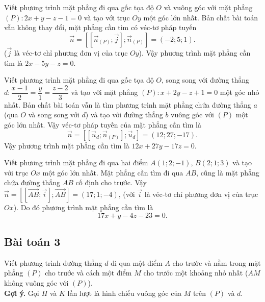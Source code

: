 \begin{vd}%
Viết phương trình mặt phẳng đi qua gốc tọa độ $O$ và vuông góc với mặt phẳng \mbox{$(P): 2x+y-z-1=0$} và tạo với trục $Oy$ một góc lớn nhất.
\loigiai
{
Bản chất bài toán vẫn không thay đổi, mặt phẳng cần tìm có véc-tơ pháp tuyến 
\[\vec{n}=\left[\left[\vec{n}_{(P)};\vec{j}\right];\vec{n}_{(P)}\right]=(-2;5;1).\] 
($\vec{j}$ là véc-tơ chỉ phương đơn vị của trục $Oy$). Vậy phương trình mặt phẳng cần tìm là $2x-5y-z=0$.
}
\end{vd} 
\begin{vd}%
Viết phương trình mặt phẳng đi qua gốc tọa độ $O$, song song với đường thẳng $d:\dfrac{x-1}{2}=\dfrac{y}{1}=\dfrac{z-2}{3}$ và tạo với mặt phẳng $(P): x+2y-z+1=0$ một góc nhỏ nhất.
\loigiai
{
Bản chất bài toán vẫn là tìm phương trình mặt phẳng chứa đường thẳng $a$ (qua $O$ và song song với $d$) và tạo với đường thẳng $b$ vuông góc với $(P)$ một góc lớn nhất. Vậy véc-tơ pháp tuyến của mặt phẳng cần tìm là 
\[\vec{n}=\left[\left[\vec{u}_d;\vec{n}_{(P)}\right]; \vec{u}_d\right]=(12;27;-17).\] 
Vậy phương trình mặt phẳng cần tìm là $12x+27y-17z=0$.
}
\end{vd} 
\begin{vd}%
Viết phương trình mặt phẳng đi qua hai điểm $A(1;2;-1)$, $B(2;1;3)$ và tạo với trục $Ox$ một góc lớn nhất.
\loigiai
{
Mặt phẳng cần tìm đi qua $AB$, cũng là mặt phẳng chứa đường thẳng $AB$ cố định cho trước. Vậy $\vec{n}=\left[\left[\vec{AB};\vec{i}\right]; \vec{AB}\right]=(17;1;-4)$, (với $\vec{i}$ là véc-tơ chỉ phương đơn vị của trục $Ox$). Do đó phương trình mặt phẳng cần tìm là \[17x+y-4z-23=0.\]
}
\end{vd} 
\subsection{Bài toán 3}
Viết phương trình đường thẳng $d$ đi qua một điểm $A$ cho trước và nằm trong mặt phẳng $(P)$ cho trước và cách một điểm $M$ cho trước một khoảng nhỏ nhất ($AM$ không vuông góc với $(P)$).\\
\textbf{Gợi ý.} Gọi $H$ và $K$ lần lượt là hình chiếu vuông góc của $M$ trên $(P)$ và $d$. 
{}

